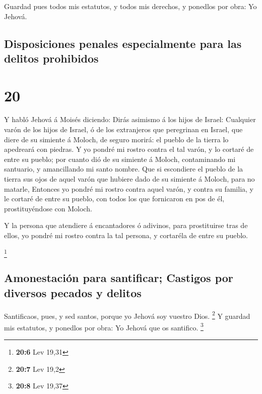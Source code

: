  Guardad pues todos mis estatutos, y todos mis derechos, y
ponedlos por obra: Yo Jehová.

\hypertarget{disposiciones-penales-especialmente-para-las-delitos-prohibidos}{%
\subsection{Disposiciones penales especialmente para las delitos
prohibidos}\label{disposiciones-penales-especialmente-para-las-delitos-prohibidos}}

\hypertarget{section-19}{%
\section{20}\label{section-19}}

 Y habló Jehová á Moisés diciendo:  Dirás
asimismo á los hijos de Israel: Cualquier varón de los hijos de Israel,
ó de los extranjeros que peregrinan en Israel, que diere de su simiente
á Moloch, de seguro morirá: el pueblo de la tierra lo apedreará con
piedras.  Y yo pondré mi rostro contra el tal varón, y lo
cortaré de entre su pueblo; por cuanto dió de su simiente á Moloch,
contaminando mi santuario, y amancillando mi santo nombre. 
Que si escondiere el pueblo de la tierra sus ojos de aquel varón que
hubiere dado de su simiente á Moloch, para no matarle, 
Entonces yo pondré mi rostro contra aquel varón, y contra su familia, y
le cortaré de entre su pueblo, con todos los que fornicaron en pos de
él, prostituyéndose con Moloch.

 Y la persona que atendiere á encantadores ó adivinos, para
prostituirse tras de ellos, yo pondré mi rostro contra la tal persona, y
cortaréla de entre su pueblo.

\footnote{\textbf{20:6} Lev 19,31}

\hypertarget{amonestaciuxf3n-para-santificar-castigos-por-diversos-pecados-y-delitos}{%
\subsection{Amonestación para santificar; Castigos por diversos pecados
y
delitos}\label{amonestaciuxf3n-para-santificar-castigos-por-diversos-pecados-y-delitos}}

 Santificaos, pues, y sed santos, porque yo Jehová soy
vuestro Dios. \footnote{\textbf{20:7} Lev 19,2}  Y guardad
mis estatutos, y ponedlos por obra: Yo Jehová que os santifico.
\footnote{\textbf{20:8} Lev 19,37}

